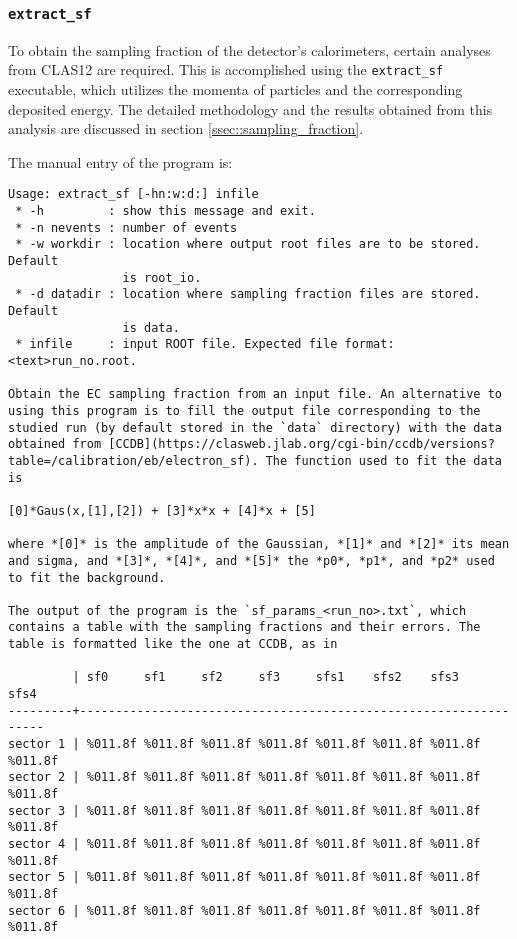 \subsubsection{\texttt{extract\_sf}}
\label{sssec::extract_sf}
    To obtain the sampling fraction of the detector's calorimeters, certain analyses from CLAS12 are required.
    This is accomplished using the \texttt{extract\_sf} executable, which utilizes the momenta of particles and the corresponding deposited energy.
    The detailed methodology and the results obtained from this analysis are discussed in section \ref{ssec::sampling_fraction}.

    The manual entry of the program is:
    \begin{lstlisting}
Usage: extract_sf [-hn:w:d:] infile
 * -h         : show this message and exit.
 * -n nevents : number of events
 * -w workdir : location where output root files are to be stored. Default
                is root_io.
 * -d datadir : location where sampling fraction files are stored. Default
                is data.
 * infile     : input ROOT file. Expected file format: <text>run_no.root.

Obtain the EC sampling fraction from an input file. An alternative to using this program is to fill the output file corresponding to the studied run (by default stored in the `data` directory) with the data obtained from [CCDB](https://clasweb.jlab.org/cgi-bin/ccdb/versions?table=/calibration/eb/electron_sf). The function used to fit the data is

[0]*Gaus(x,[1],[2]) + [3]*x*x + [4]*x + [5]

where *[0]* is the amplitude of the Gaussian, *[1]* and *[2]* its mean and sigma, and *[3]*, *[4]*, and *[5]* the *p0*, *p1*, and *p2* used to fit the background.

The output of the program is the `sf_params_<run_no>.txt`, which contains a table with the sampling fractions and their errors. The table is formatted like the one at CCDB, as in

         | sf0     sf1     sf2     sf3     sfs1    sfs2    sfs3    sfs4
---------+-----------------------------------------------------------------
sector 1 | %011.8f %011.8f %011.8f %011.8f %011.8f %011.8f %011.8f %011.8f
sector 2 | %011.8f %011.8f %011.8f %011.8f %011.8f %011.8f %011.8f %011.8f
sector 3 | %011.8f %011.8f %011.8f %011.8f %011.8f %011.8f %011.8f %011.8f
sector 4 | %011.8f %011.8f %011.8f %011.8f %011.8f %011.8f %011.8f %011.8f
sector 5 | %011.8f %011.8f %011.8f %011.8f %011.8f %011.8f %011.8f %011.8f
sector 6 | %011.8f %011.8f %011.8f %011.8f %011.8f %011.8f %011.8f %011.8f
    \end{lstlisting}
